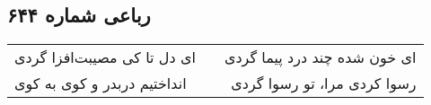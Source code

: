 \begin{center}
\section*{رباعی شماره ۶۴۴}
\label{sec:sh644}
\begin{longtable}{l p{0.5cm} r}
ای دل تا کی مصیبت‌افزا گردی
&&
ای خون شده چند درد پیما گردی
\\
انداختیم دربدر و کوی به کوی
&&
رسوا کردی مرا، تو رسوا گردی
\\
\end{longtable}
\end{center}
